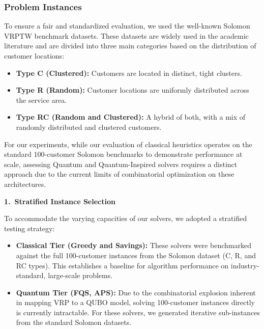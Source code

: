 \documentclass[conference]{IEEEtran}
\begin{document}
\subsubsection{Problem Instances}
To ensure a fair and standardized evaluation, we used the well-known Solomon VRPTW benchmark datasets. These datasets \cite{solomon1987} are widely used in the academic literature \cite{electronics14040647} \cite{su151410982} \cite{Poohoi2024StasKmeanVRPTW} \cite{YaoMo2025TDVRPSubwayTRISTAN} and are divided into three main categories based on the distribution of customer locations:



\begin{itemize}
  \item \textbf{Type C (Clustered):} Customers are located in distinct, tight clusters.
  \item \textbf{Type R (Random):} Customer locations are uniformly distributed across the service area.
  \item \textbf{Type RC (Random and Clustered):} A hybrid of both, with a mix of randomly distributed and clustered customers.
\end{itemize} 
 



For our experiments, while our evaluation of classical heuristics operates on the standard 100-customer Solomon benchmarks to demonstrate performance at scale, assessing Quantum and Quantum-Inspired solvers requires a distinct approach due to the current limits of combinatorial optimization on these architectures.

\textbf{1.\ Stratified Instance Selection}

To accommodate the varying capacities of our solvers, we adopted a stratified testing strategy:

\begin{itemize}
    \item \textbf{Classical Tier (Greedy and Savings):} These solvers were benchmarked against the full 100-customer instances from the Solomon dataset (C, R, and RC types). This establishes a baseline for algorithm performance on industry-standard, large-scale problems.

    \item \textbf{Quantum Tier (FQS, APS):} Due to the combinatorial explosion inherent in mapping VRP to a QUBO model, solving 100-customer instances directly is currently intractable. For these solvers, we generated iterative sub-instances from the standard Solomon datasets.
\end{itemize}
\end{document}
